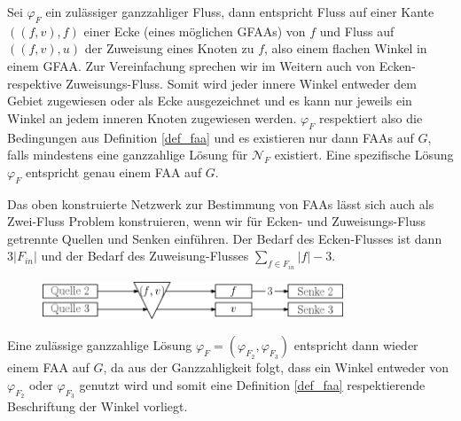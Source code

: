 Sei $\varphi_F$ ein zulässiger ganzzahliger Fluss, dann entspricht Fluss auf einer Kante $((f,v),f)$ einer Ecke (eines möglichen GFAAs) von $f$ und Fluss auf $((f,v),u)$ der Zuweisung eines Knoten zu $f$, also einem flachen Winkel in einem GFAA. Zur Vereinfachung sprechen wir im Weitern auch von Ecken- respektive Zuweisungs-Fluss. Somit wird jeder innere Winkel entweder dem Gebiet zugewiesen oder als Ecke ausgezeichnet und es kann nur jeweils ein Winkel an jedem inneren Knoten zugewiesen werden. $\varphi_F$ respektiert also die Bedingungen aus Definition \ref{def_faa} und es existieren nur dann FAAs auf $G$, falls mindestens eine ganzzahlige Lösung für $\mathcal{N}_F$ existiert. Eine spezifische Lösung $\varphi_F$ entspricht genau einem FAA auf $G$.

\begin{remark}

Das oben konstruierte Netzwerk zur Bestimmung von FAAs lässt sich auch als Zwei-Fluss Problem konstruieren, wenn wir für Ecken- und Zuweisungs-Fluss getrennte Quellen und Senken einführen. Der Bedarf des Ecken-Flusses ist dann $3|F_{in}|$ und der Bedarf des Zuweisung-Flusses $\sum_{f \in F_{in}}{|f|-3}$.

\begin{figure}[h]
	\centering
  \includegraphics[width=0.8\textwidth]{faa_2_flow.png}
\end{figure}

Eine zulässige ganzzahlige Lösung $\varphi_F = (\varphi_{F_2},\varphi_{F_3})$ entspricht dann wieder einem FAA auf $G$, da aus der Ganzzahligkeit folgt, dass ein Winkel entweder von $\varphi_{F_2}$ oder $\varphi_{F_3}$ genutzt wird und somit eine Definition \ref{def_faa} respektierende Beschriftung der Winkel vorliegt.

\end{remark}


